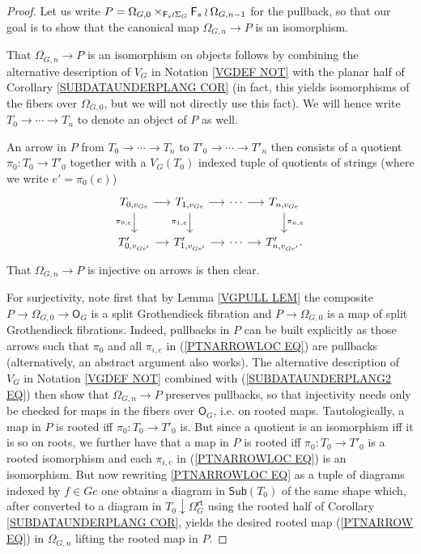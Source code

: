 \documentclass[a4paper,10pt]{article}%
\begin{document}
\begin{proof}
Let us write 
$P = \Omega_{G,0} \times_{\mathsf{F}_s \wr \Sigma_G} \mathsf{F}_s \wr \Omega_{G,n-1}$ for the pullback,
so that our goal is to show that the canonical map
$\Omega_{G,n} \to P$ is an isomorphism. 

That $\Omega_{G,n} \to P$ is an isomorphism on objects 
follows by combining the alternative description of $V_G$
in Notation \ref{VGDEF NOT} with the planar half of
Corollary \ref{SUBDATAUNDERPLANG COR}
(in fact, this yields isomorphisms of the fibers over 
$\Omega_{G,0}$, but we will not directly use this fact).
We will hence write $T_0 \to \cdots \to T_n$
to denote an object of $P$ as well.

An arrow in $P$ from 
$T_0 \to \cdots \to T_n$ to 
$T'_0 \to \cdots \to T'_n$
then consists of a quotient 
$\pi_0 \colon T_0 \to T'_0$
together with a $V_G(T_0)$ indexed tuple of quotients of strings (where we write $e'=\pi_0(e)$)
\begin{equation} \label{PTNARROWLOC EQ}
\begin{tikzcd}[column sep=1.2em]
	T_{0,v_{G e}} \ar{r}{} \ar{d}[swap]{\pi_{0,e}} & 
	T_{1,v_{G e}} \ar{r}{} \ar{d}[swap]{\pi_{1,e}} &
	\cdots \ar{r}{} &
	T_{n,v_{G e}} \ar{d}{\pi_{n,e}}
\\
	T'_{0,v_{G e'}} \ar{r}{} &
	T'_{1,v_{G e'}} \ar{r}{} &
	\cdots \ar{r}{} &
	T'_{n,v_{G e'}}.
\end{tikzcd}	
\end{equation}
That $\Omega_{G,n} \to P$ is injective on arrows is then clear.

For surjectivity, note first that by Lemma \ref{VGPULL LEM} the composite $P \to \Omega_{G,0} \to \mathsf{O}_G$
is a split Grothendieck fibration and 
$P \to \Omega_{G,0}$ is a map of split Grothendieck fibrations. 
Indeed, pullbacks in $P$ can be built explicitly as those arrows such that $\pi_0$ and all $\pi_{i,e}$ in 
(\ref{PTNARROWLOC EQ})
are pullbacks (alternatively, an abstract argument also works).
The alternative description of $V_G$ in 
Notation \ref{VGDEF NOT} combined with
(\ref{SUBDATAUNDERPLANG2 EQ}) 
then show that 
$\Omega_{G,n} \to P$ preserves pullbacks,
so that injectivity needs only be checked for maps in the fibers over $\mathsf{O}_G$, i.e. on rooted maps.
Tautologically, a map in $P$ is rooted iff $\pi_0 \colon T_0 \to T'_0$ is.
But since a quotient is an isomorphism iff it is so on roots,
we further have that
a map in $P$ is rooted iff $\pi_0 \colon T_0 \to T'_0$
is a rooted isomorphism and
each $\pi_{i,e}$ in (\ref{PTNARROWLOC EQ}) is an isomorphism.
But now rewriting \ref{PTNARROWLOC EQ} as a tuple of diagrams indexed by
$f \in G e$
one obtains a diagram in $\mathsf{Sub}(T_0)$ of the same shape  which, after converted to a diagram in 
$T_0 \downarrow \Omega_G^{\mathsf{rt}}$
using the rooted half of Corollary \ref{SUBDATAUNDERPLANG COR},
yields the desired rooted map (\ref{PTNARROW EQ})
in $\Omega_{G,n}$ lifting the rooted map in $P$.
\end{proof}
\end{document}
